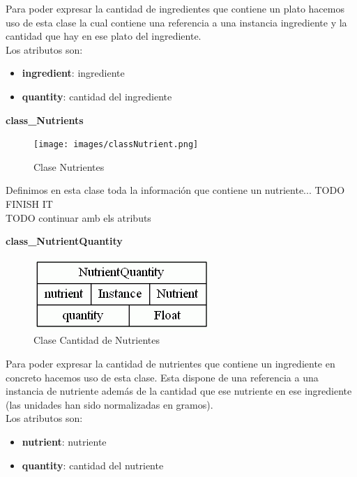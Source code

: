 \documentclass[12]{article}
\begin{document}
Para poder expresar la cantidad de ingredientes que contiene un plato hacemos uso de esta clase la cual contiene una referencia a una instancia ingrediente y la cantidad que hay en ese plato del ingrediente.
\\

Los atributos son: 
\begin{itemize}
\item \textbf{ingredient}: ingrediente
\item \textbf{quantity}: cantidad del ingrediente
\end{itemize}


\vspace{0.5cm}

\textbf{class\_Nutrients}
\begin{figure}[H]
\centering
\texttt{[image: images/classNutrient.png]}
\caption{Clase Nutrientes}
\label{nutrientes}
\end{figure}

Definimos en esta clase toda la información que contiene un nutriente... TODO FINISH IT 
\\
TODO continuar amb els atributs


\vspace{0.5cm}

\textbf{class\_NutrientQuantity}
\begin{figure}[H]
\centering
\includegraphics[scale=0.5]{images/classNutrientQuantity.png}
\caption{Clase Cantidad de Nutrientes}
\label{cantidad_nutriente}
\end{figure}

Para poder expresar la cantidad de nutrientes que contiene un ingrediente en concreto hacemos uso de esta clase. Esta dispone de una referencia a una instancia de nutriente además de la cantidad que ese nutriente en ese ingrediente (las unidades han sido normalizadas en gramos). 
\\

Los atributos son: 
\begin{itemize}
\item \textbf{nutrient}: nutriente
\item \textbf{quantity}: cantidad del nutriente
\end{itemize}
\end{document}
